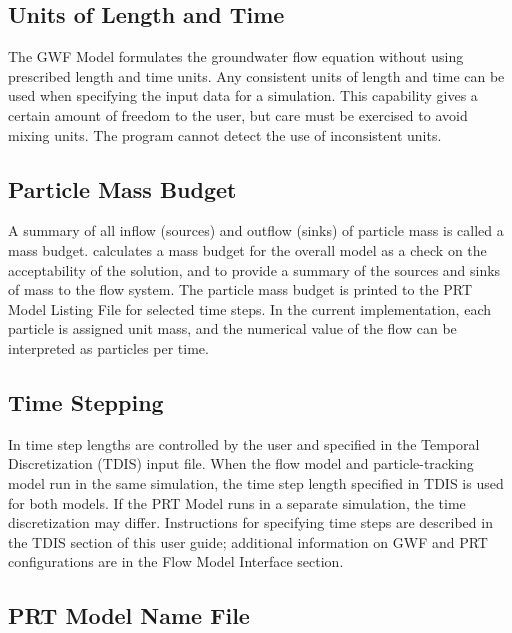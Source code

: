 \subsection{Units of Length and Time}
The GWF Model formulates the groundwater flow equation without using prescribed length and time units. Any consistent units of length and time can be used when specifying the input data for a simulation. This capability gives a certain amount of freedom to the user, but care must be exercised to avoid mixing units.  The program cannot detect the use of inconsistent units.

\subsection{Particle Mass Budget}
A summary of all inflow (sources) and outflow (sinks) of particle mass is called a mass budget.  \mf calculates a mass budget for the overall model as a check on the acceptability of the solution, and to provide a summary of the sources and sinks of mass to the flow system.  The particle mass budget is printed to the PRT Model Listing File for selected time steps.  In the current implementation, each particle is assigned unit mass, and the numerical value of the flow can be interpreted as particles per time.

\subsection{Time Stepping}
In \mf time step lengths are controlled by the user and specified in the Temporal Discretization (TDIS) input file.  When the flow model and particle-tracking model run in the same simulation, the time step length specified in TDIS is used for both models.  If the PRT Model runs in a separate simulation, the time discretization may differ.  Instructions for specifying time steps are described in the TDIS section of this user guide; additional information on GWF and PRT configurations are in the Flow Model Interface section.  



\newpage
\subsection{PRT Model Name File}


%

